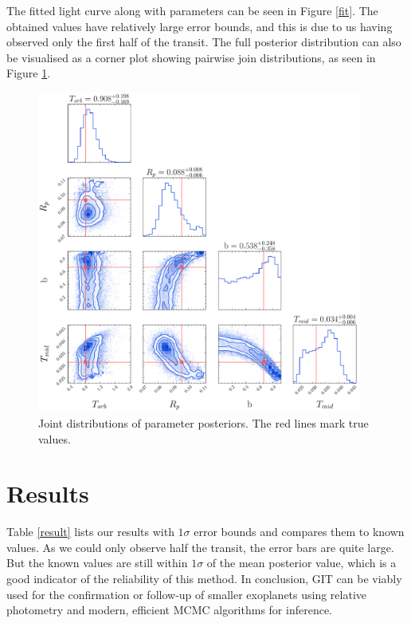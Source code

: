 \documentclass[12pt]{article}
\begin{document}
The fitted light curve along with parameters can be seen in Figure \ref{fit}. The obtained values have relatively large error bounds, and this is due to us having observed only the first half of the transit. The full posterior distribution can also be visualised as a corner plot \citep{corner} showing pairwise join distributions, as seen in Figure \ref{corner}.

\begin{figure}[h]
    \centering
    \includegraphics[width = 0.95\textwidth]{./images/corner.pdf}
    \caption{Joint distributions of parameter posteriors. The red lines mark true values.}
    \label{corner}
\end{figure}






\section{Results}
Table \ref{result} lists our results with $1\sigma$ error bounds and compares them to known values. As we could only observe half the transit, the error bars are quite large. But the known values are still within $1\sigma$ of the mean posterior value, which is a good indicator of the reliability of this method. In conclusion, GIT can be viably used for the confirmation or follow-up of smaller exoplanets using relative photometry and modern, efficient MCMC algorithms for inference.
\end{document}

